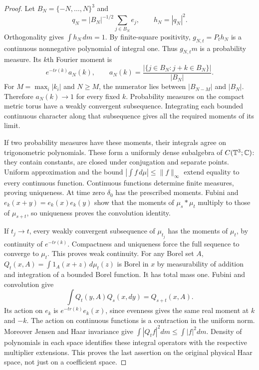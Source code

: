 \documentclass[11pt]{article}
\theoremstyle{remark}\newtheorem{remark}[theorem]{Remark}
\begin{document}
\begin{proof}
Let $B_N=\{-N,\ldots,N\}^3$ and
\[
 q_N=|B_N|^{-1/2}\sum_{j\in B_N}e_j,\qquad h_N=|q_N|^2.
\]
Orthogonality gives $\int h_N\,dm=1$. By finite-square positivity,
$g_{N,t}=P_t h_N$ is a continuous nonnegative polynomial of integral
one. Thus $g_{N,t}m$ is a probability measure. Its $k$th Fourier moment is
\[
 e^{-tr(k)}a_N(k),\qquad
 a_N(k)=\frac{|\{j\in B_N:j+k\in B_N\}|}{|B_N|}.
\]
For $M=\max_i|k_i|$ and $N\geq M$, the numerator lies between
$|B_{N-M}|$ and $|B_N|$. Therefore $a_N(k)\to1$ for every fixed $k$.
Probability measures on the compact metric torus have a weakly convergent
subsequence. Integrating each bounded continuous character along that
subsequence gives all the required moments of its limit.

If two probability measures have these moments, their integrals agree
on trigonometric polynomials. These form a uniformly dense subalgebra
of $C(\mathbb T^3;\mathbb C)$: they contain constants, are closed under conjugation
and separate points. Uniform approximation and the bound
$|\int f\,d\mu|\leq\|f\|_\infty$ extend equality to every continuous
function. Continuous functions determine finite measures, proving
uniqueness. At time zero $\delta_0$ has the prescribed moments.
Fubini and $e_k(x+y)=e_k(x)e_k(y)$ show that the moments of
$\mu_s*\mu_t$ multiply to those of $\mu_{s+t}$, so uniqueness proves
the convolution identity.

If $t_j\to t$, every weakly convergent subsequence of $\mu_{t_j}$
has the moments of $\mu_t$, by continuity of $e^{-tr(k)}$.
Compactness and uniqueness force the full sequence to converge to
$\mu_t$. This proves weak continuity. For any Borel set $A$,
$Q_t(x,A)=\int1_A(x+z)\,d\mu_t(z)$ is Borel in $x$ by measurability
of addition and integration of a bounded Borel function. It has total
mass one. Fubini and convolution give
\[
 \int Q_t(y,A)Q_s(x,dy)=Q_{s+t}(x,A).
\]
Its action on $e_k$ is $e^{-tr(k)}e_k(x)$, since evenness gives the
same real moment at $k$ and $-k$. The action on continuous functions is
a contraction in the uniform norm. Moreover Jensen and Haar invariance
give $\int|Q_tf|^2dm\leq\int|f|^2dm$. Density of polynomials in each
space identifies these integral operators with the respective
multiplier extensions. This proves the last assertion on the original
physical Haar space, not just on a coefficient space.
\end{proof}
\end{document}
